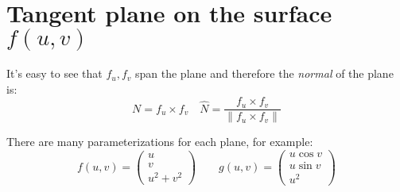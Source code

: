 \documentclass[00_complete]{subfiles}
\begin{document}
\section{Tangent plane on the surface \texorpdfstring{$f(u,v)$}{f(u,v)}}

It's easy to see that $f_u,f_v$ span the plane and therefore the \emph{normal}
of the plane is:
$$N=f_u \times f_v \quad \hat N = \frac{f_u \times f_v}{\|f_u \times f_v\|}$$
\begin{note}
    There are many parameterizations for each plane, for example:
    $$f(u,v)=\begin{pmatrix}
        u\\v\\u^2+v^2
    \end{pmatrix} \qquad g(u,v) = \begin{pmatrix}
        u\cos v \\ u \sin v \\ u^2
    \end{pmatrix}$$
\end{note}
\end{document}
